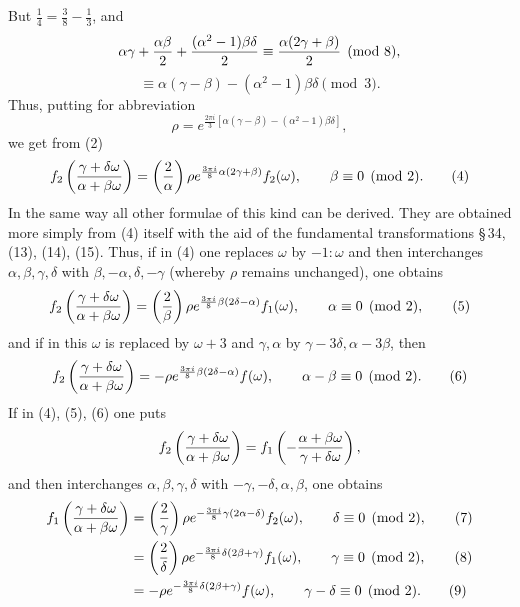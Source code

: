 \documentclass[11pt]{article}
\newcommand{\Jac}[2]{\left(\frac{#1}{#2}\right)}
\begin{document}
But $\frac14=\frac38-\frac13$, and
\[
\alpha\gamma+{\alpha\beta\over2}+{(\alpha^2-1)\beta\delta\over2}
\equiv {\alpha(2\gamma+
\beta)\over2}\pmod 8,
\]
\[
\equiv \alpha(\gamma-\beta)-(\alpha^2-1)\beta\delta\pmod 3.
\]
Thus, putting for abbreviation
\begin{equation}
\rho=e^{\frac{2\pi i}{3}[\alpha(\gamma-\beta)-(\alpha^2-1)\beta\delta]},
\tag{3}
\end{equation}
we get from (2)
\begin{equation}
f_2\left({\gamma+
\delta\omega\over\alpha+
\beta\omega}\right)
=\Jac{2}{\alpha}\rho e^{\frac{3\pi i}{8}\alpha(2\gamma+
\beta)}f_2(\omega),
\qquad \beta\equiv0\pmod2. 
\tag{4}
\end{equation}
In the same way all other formulae of this kind can be derived. They are obtained more simply from (4) itself with the aid of the fundamental transformations \S\,34, (13), (14), (15). Thus, if in (4) one replaces $\omega$ by $-1:\omega$ and then interchanges $\alpha,\beta,\gamma,\delta$ with $\beta,-\alpha,\delta,-\gamma$ (whereby $\rho$ remains unchanged), one obtains
\begin{equation}
f_2\left({\gamma+
\delta\omega\over\alpha+
\beta\omega}\right)
=\Jac{2}{\beta}\rho e^{\frac{3\pi i}{8}\beta(2\delta-
\alpha)}f_1(\omega),
\qquad \alpha\equiv0\pmod2,
\tag{5}
\end{equation}
and if in this $\omega$ is replaced by $\omega+3$ and $\gamma,
\alpha$ by $\gamma-3\delta,
\alpha-3\beta$, then
\begin{equation}
f_2\left({\gamma+
\delta\omega\over\alpha+
\beta\omega}\right)
=-\rho e^{\frac{3\pi i}{8}\beta(2\delta-
\alpha)}f(\omega),
\qquad \alpha-
\beta\equiv0\pmod2. 
\tag{6}
\end{equation}
If in (4), (5), (6) one puts
\[
f_2\left({\gamma+
\delta\omega\over\alpha+
\beta\omega}\right)
=f_1\left(-{\alpha+
\beta\omega\over\gamma+
\delta\omega}\right),
\]
and then interchanges $\alpha,\beta,\gamma,\delta$ with $-\gamma,-\delta,\alpha,\beta$, one obtains
\begin{align}
f_1\left({\gamma+
\delta\omega\over\alpha+
\beta\omega}\right)
&=\Jac{2}{\gamma}\rho e^{-\frac{3\pi i}{8}\gamma(2\alpha-
\delta)}f_2(\omega),
\qquad \delta\equiv0\pmod2, \tag{7}\\
&=\Jac{2}{\delta}\rho e^{-\frac{3\pi i}{8}\delta(2\beta+
\gamma)}f_1(\omega),
\qquad \gamma\equiv0\pmod2, \tag{8}\\
&=-\rho e^{-\frac{3\pi i}{8}\delta(2\beta+
\gamma)}f(\omega),
\qquad \gamma-
\delta\equiv0\pmod2. \tag{9}
\end{align}
\end{document}
